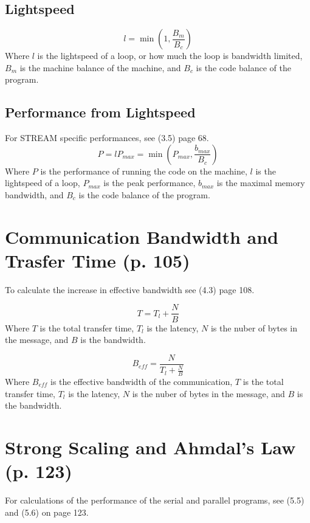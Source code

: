\documentclass{article}
\begin{document}
		\subsection{Lightspeed}
			\begin{equation}
				l=\min\left(1,\frac{B_m}{B_c}\right)
			\end{equation}
			Where $l$ is the lightspeed of a loop, or how much the loop is bandwidth limited, $B_m$ is the machine balance of the machine, and $B_c$ is the code balance of the program.
		
		\subsection{Performance from Lightspeed}
			For STREAM specific performances, see (3.5) page 68.
			\begin{equation}
				P=lP_{max}=\min\left(P_{max},\frac{b_{max}}{B_c}\right)
			\end{equation}
			Where $P$ is the performance of running the code on the machine, $l$ is the lightspeed of a loop, $P_{max}$ is the peak performance, $b_{max}$ is the maximal memory bandwidth, and $B_c$ is the code balance of the program.
	
	\section{Communication Bandwidth and Trasfer Time (p. 105)}
		To calculate the increase in effective bandwidth see (4.3) page 108.

		\begin{equation}
			T=T_l+\frac{N}{B}
		\end{equation}
		Where $T$ is the total transfer time, $T_l$ is the latency, $N$ is the nuber of bytes in the message, and $B$ is the bandwidth.

		\begin{equation}
			B_{eff}=\frac{N}{T_l+\frac{N}{B}}
		\end{equation}
		Where $B_{eff}$ is the effective bandwidth of the communication, $T$ is the total transfer time, $T_l$ is the latency, $N$ is the nuber of bytes in the message, and $B$ is the bandwidth.
	
	\section{Strong Scaling and Ahmdal's Law (p. 123)}
		For calculations of the performance of the serial and parallel programs, see (5.5) and (5.6) on page 123.
\end{document}
